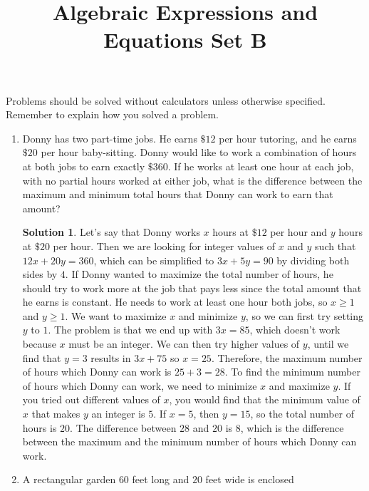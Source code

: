 \documentclass{article}
\title{Algebraic Expressions and Equations Set B}
\author{}
\date{}
\theoremstyle{definition}
\newtheorem*{solution}{Solution}
\begin{document}
    \maketitle
    \noindent Problems should be solved without calculators unless otherwise
    specified. Remember to explain how you solved a problem.
    \begin{enumerate}
        \item Donny has two part-time jobs. He earns $\$12$ per hour tutoring,
        and he earns $\$20$ per hour baby-sitting. Donny would like to work a
        combination of hours at both jobs to earn exactly $\$360$. If he works
        at least one hour at each job, with no partial hours worked at either
        job, what is the difference between the maximum and minimum total hours
        that Donny can work to earn that amount?
        \begin{solution}
            Let's say that Donny works $x$ hours at $\$12$ per hour and $y$
            hours at $\$20$ per hour. Then we are looking for integer values of
            $x$ and $y$ such that $12x + 20y = 360$, which can be simplified to
            $3x + 5y = 90$ by dividing both sides by $4$. If Donny wanted to
            maximize the total number of hours, he should try to work more at
            the job that pays less since the total amount that he earns is
            constant. He needs to work at least one hour both jobs, so $x \geq
            1$ and $y \geq 1$. We want to maximize $x$ and minimize $y$, so we
            can first try setting $y$ to $1$. The problem is that we end up with
            $3x = 85$, which doesn't work because $x$ must be an integer. We can
            then try higher values of $y$, until we find that $y = 3$ results in
            $3x + 75$ so $x = 25$. Therefore, the maximum number of hours which
            Donny can work is $25 + 3 = 28$. To find the minimum number of hours
            which Donny can work, we need to minimize $x$ and maximize $y$. If
            you tried out different values of $x$, you would find that the
            minimum value of $x$ that makes $y$ an integer is $5$. If $x = 5$,
            then $y = 15$, so the total number of hours is $20$. The difference
            between $28$ and $20$ is $8$, which is the difference between the
            maximum and the minimum number of hours which Donny can work.
        \end{solution}
        \item A rectangular garden $60$ feet long and $20$ feet wide is enclosed

\end{enumerate}
\end{document}
